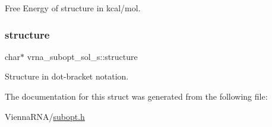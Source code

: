 Free Energy of structure in kcal/mol. 

\mbox{\label{structvrna__subopt__sol__s_a3c632c7f08eb6a8827c6151625e5ef8e}} 
\subsubsection{\texorpdfstring{structure}{structure}}
{\footnotesize\ttfamily char$\ast$ vrna\+\_\+subopt\+\_\+sol\+\_\+s\+::structure}



Structure in dot-\/bracket notation. 



The documentation for this struct was generated from the following file\+:\begin{DoxyCompactItemize}
\item 
Vienna\+R\+N\+A/\mbox{\hyperlink{subopt_8h}{subopt.\+h}}\end{DoxyCompactItemize}
